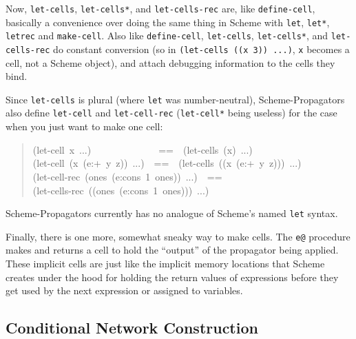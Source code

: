 \documentclass[12pt,letterpaper,english]{article}
\begin{document}
Now, \texttt{let-cells}, \texttt{let-cells*}, and \texttt{let-cells-rec} are, like
\texttt{define-cell}, basically a convenience over doing the same thing in
Scheme with \texttt{let}, \texttt{let*}, \texttt{letrec} and \texttt{make-cell}.  Also
like \texttt{define-cell}, \texttt{let-cells}, \texttt{let-cells*}, and
\texttt{let-cells-rec} do constant conversion (so in \texttt{(let-cells ((x 3)) ...)},
\texttt{x} becomes a cell, not a Scheme object), and attach
debugging information to the cells they bind.

Since \texttt{let-cells} is plural (where \texttt{let} was number-neutral),
Scheme-Propagators also define \texttt{let-cell} and \texttt{let-cell-rec}
(\texttt{let-cell*} being useless) for the case when you just want to make
one cell:
\begin{quote}{\ttfamily \raggedright \noindent
(let-cell~x~...)~~~~~~~~~~~~~~==~~(let-cells~(x)~...)~\\
(let-cell~(x~(e:+~y~z))~...)~~==~~(let-cells~((x~(e:+~y~z)))~...)~\\
(let-cell-rec~(ones~(e:cons~1~ones))~...)~~==~\\
(let-cells-rec~((ones~(e:cons~1~ones)))~...)
}\end{quote}

Scheme-Propagators currently has no analogue of Scheme's named \texttt{let}
syntax.

Finally, there is one more, somewhat sneaky way to make cells.
The \texttt{e@}
procedure makes and returns a cell to hold the ``output'' of the
propagator being applied.  These implicit cells are just
like the implicit memory locations that Scheme creates under the hood
for holding the return values of expressions before they get used by
the next expression or assigned to variables.



\hypertarget{conditional-network-construction}{}
\subsection{Conditional Network Construction}
\label{conditional-network-construction}
\end{document}
